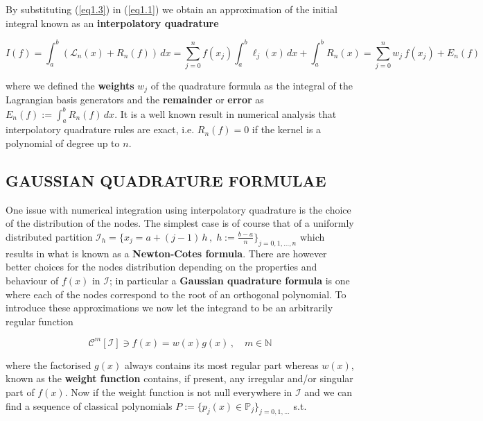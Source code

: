 \documentclass[a4paper, twosided]{book}
\begin{document}
\noindent
By substituting (\ref{eq1.3}) in (\ref{eq1.1}) we obtain an approximation of the initial integral known as an \color{poliDarkBlue} \textbf{interpolatory quadrature} \color{black}

\begin{equation}\label{eq1.4}
    I(f) = \int_a^b (\mathcal{L}_n(x) + R_n(f))\,dx = \sum_{j=0}^{n}f(x_j)\int_a^b \ell_j(x)\,dx + \int_a^b R_n(x) = \sum_{j=0}^{n}w_j\,f(x_j) + E_n(f)
\end{equation}

\noindent
where we defined the \color{poliDarkBlue} \textbf{weights} \color{black} $w_j$ of the quadrature formula as the integral of the Lagrangian basis generators and the \color{poliDarkBlue} \textbf{remainder} \color{black} or \color{poliDarkBlue} \textbf{error} \color{black} as $E_n(f):=\int_a^b R_n(f)\,dx$. It is a well known result in numerical analysis that interpolatory quadrature rules are exact, i.e. $R_n(f)=0$ if the kernel is a polynomial of degree up to $n$.

\subsection[Gaussian quadrature formulae]{\changefont GAUSSIAN QUADRATURE FORMULAE}\label{SubSec1.2.2}

One issue with numerical integration using interpolatory quadrature is the choice of the distribution of the nodes. The simplest case is of course that of a uniformly distributed partition 
$\mathcal{I}_h =\big\{x_j = a + (j-1)\,h\,,\;h:=\frac{b-a}{n}\big\}_{j=0,1,...,n}$ which results in what is known as a \color{poliDarkBlue} \textbf{Newton-Cotes formula}\color{black}. There are however better choices for the nodes distribution depending on the properties and behaviour of $f(x)$ in $\mathcal{I}$; in particular a \color{poliDarkBlue} \textbf{Gaussian quadrature formula} \color{black} is one where each of the nodes correspond to the root of an orthogonal polynomial. To introduce these approximations we now let the integrand to be an arbitrarily regular function

\begin{equation}\label{eq1.5}
    \mathcal{C}^m[\mathcal{I}]\ni f(x) = w(x)g(x)\,,\quad m\in\mathbb{N}
\end{equation}

\noindent
where the factorised $g(x)$ always contains its most regular part whereas $w(x)$, known as the \color{poliDarkBlue} \textbf{weight function} \color{black} contains, if present, any irregular and/or singular part of $f(x)$. Now if the weight function is not null everywhere in $\mathcal{I}$ and we can find a sequence of classical polynomials $P:=\big\{p_j(x)\in\mathbb{P}_j\big\}_{j=0,1,...}$ s.t.
\end{document}
